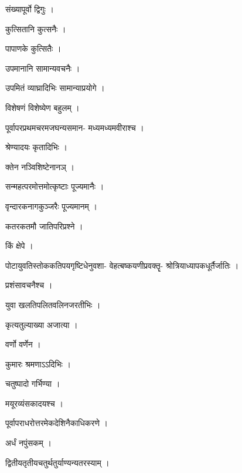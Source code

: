 \documentclass[10pt, openany]{book}
\begin{document}
\noindent संख्यापूर्वो द्विगुः ।

\noindent कुत्सितानि कुत्सनैः ।

\noindent पापाणके कुत्सितैः ।

\noindent उपमानानि सामान्यवचनैः ।

\noindent उपमितं व्याघ्रादिभिः सामान्याप्रयोगे ।

\noindent विशेषणं विशेष्येण बहुलम् ।

\noindent पूर्वापरप्रथमचरमजघन्यसमान- मध्यमध्यमवीराश्च ।

\noindent श्रेण्यादयः कृतादिभिः ।

\noindent क्तेन नञ्विशिष्टेनानञ् ।

\noindent सन्महत्परमोत्तमोत्कृष्टाः पूज्यमानैः ।

\noindent वृन्दारकनागकुञ्जरैः पूज्यमानम् ।

\noindent कतरकतमौ जातिपरिप्रश्ने ।

\noindent किं क्षेपे ।

\noindent पोटायुवतिस्तोककतिपयगृष्टिधेनुवशा- वेहत्बष्कयणीप्रवक्तॄ- श्रोत्रियाध्यापकधूर्तैर्जातिः ।

\noindent प्रशंसावचनैश्च ।

\noindent युवा खलतिपलितवलिनजरतीभिः ।

\noindent कृत्यतुल्याख्या अजात्या ।

\noindent वर्णो वर्णेन ।

\noindent कुमारः श्रमणाऽऽदिभिः ।

\noindent चतुष्पादो गर्भिण्या ।

\noindent मयूरव्यंसकादयश्च ।

\noindent पूर्वापराधरोत्तरमेकदेशिनैकाधिकरणे ।

\noindent अर्धं नपुंसकम् ।

\noindent द्वितीयतृतीयचतुर्थतुर्याण्यन्यतरस्याम् ।
\end{document}
